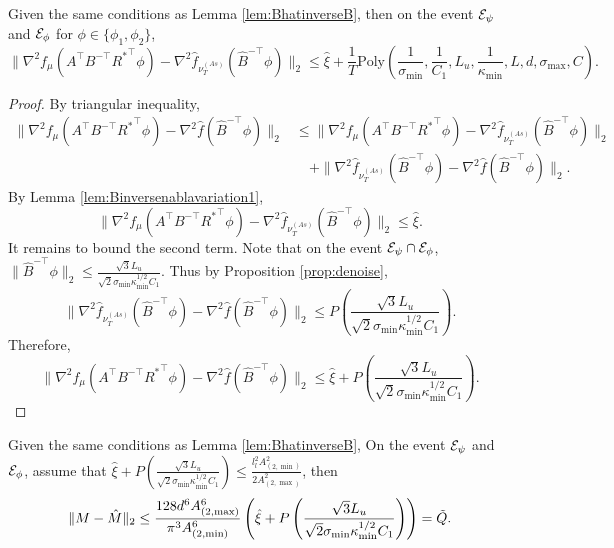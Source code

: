 \begin{lemma}
\label{lem:Binversenablavariation2}
Given the same conditions as Lemma \ref{lem:BhatinverseB}, then on the event $\mathcal{E}_{\psi}$ and $\mathcal{E}_{\phi}$ for $\phi \in \{\phi_1, \phi_2\}$,
\[
\|\nabla^2 f_{\mu}(A^{\top}B^{-\top}{R^*}^{\top}\phi) - \nabla^2 \hat{f}_{\nu_T^{(As)}}(\hat{B}^{-\top}\phi)  \|_2 
\le
 \hat{\xi}
+
\frac{1}{T}\text{Poly}\left(\frac{1}{\sigma_{\min}}, \frac{1}{C_1}, L_u, \frac{1}{\kappa_{\min}}, L, d, \sigma_{\max}, C\right).
\]
\end{lemma}
\begin{proof}
By triangular inequality, 
\begin{align*}
\|\nabla^2 f_{\mu}(A^{\top}B^{-\top}{R^*}^{\top}\phi) - \nabla^2 \hat{f}(\hat{B}^{-\top}\phi)  \|_2 
& \le 
\|\nabla^2 f_{\mu}(A^{\top}B^{-\top}{R^*}^{\top}\phi) - \nabla^2 \hat{f}_{\nu_T^{(As)}}(\hat{B}^{-\top}\phi)  \|_2 \\
& \quad +
\|\nabla^2 \hat{f}_{\nu_T^{(As)}}(\hat{B}^{-\top}\phi) - \nabla^2 \hat{f}(\hat{B}^{-\top}\phi)  \|_2. 
\end{align*}
By Lemma \ref{lem:Binversenablavariation1}, 
\[
\|\nabla^2 f_{\mu}(A^{\top}B^{-\top}{R^*}^{\top}\phi) - \nabla^2 \hat{f}_{\nu_T^{(As)}}(\hat{B}^{-\top}\phi)  \|_2 
\le \hat{\xi}. 
\]
It remains to bound the second term. 
Note that on the event $\mathcal{E}_{\psi}\cap\mathcal{E}_{\phi}$, $\|\hat{B}^{-\top}\phi\|_2 \le \frac{\sqrt{3}L_u}{\sqrt{2}\sigma_{\min}\kappa_{\min}^{1/2}C_1}$. 
Thus by Proposition \ref{prop:denoise}, 
\[
\|\nabla^2 \hat{f}_{\nu_T^{(As)}}(\hat{B}^{-\top}\phi) - \nabla^2 \hat{f}(\hat{B}^{-\top}\phi)  \|_2 \le P\left(\frac{\sqrt{3}L_u}{\sqrt{2}\sigma_{\min}\kappa_{\min}^{1/2}C_1}\right).
\]
Therefore, 
\[
\|\nabla^2 f_{\mu}(A^{\top}B^{-\top}{R^*}^{\top}\phi) - \nabla^2 \hat{f}(\hat{B}^{-\top}\phi)  \|_2 
\le 
 \hat{\xi}
+
P\left(\frac{\sqrt{3}L_u}{\sqrt{2}\sigma_{\min}\kappa_{\min}^{1/2}C_1}\right).
\]
\end{proof}
\begin{lemma}
\label{lem:Tvariantion}
Given the same conditions as Lemma \ref{lem:BhatinverseB}, On the event $\mathcal{E}_{\psi}$ and $\mathcal{E}_{\phi}$, assume that $\hat{\xi}
+
P\left(\frac{\sqrt{3}L_u}{\sqrt{2}\sigma_{\min}\kappa_{\min}^{1/2}C_1}\right)\le \frac{l_l^2 A^2_{(2,\min)}}{2A^2_{(2,\max)}}$, then 
\[
\|M - \hat{M}\|_2 \le  \frac{128d^6A^6_{(2,\max)}}{\pi^3 A^6_{(2,\min)}}\left(\hat{\xi}+
P\left(\frac{\sqrt{3}L_u}{\sqrt{2}\sigma_{\min}\kappa_{\min}^{1/2}C_1}\right)\right) = \tilde{Q}.
\]
\end{lemma}

